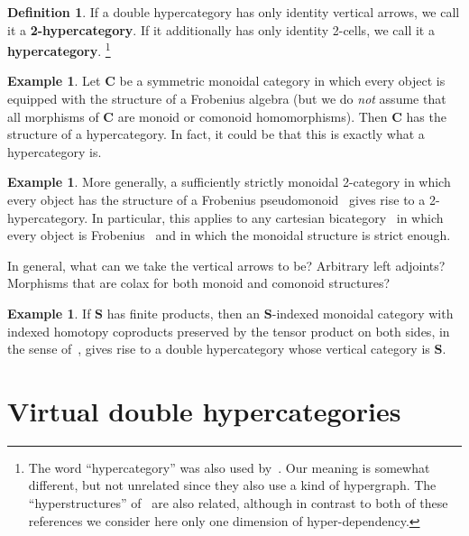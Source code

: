 \documentclass{article}
\theoremstyle{definition}
\newtheorem{defn}[thm]{Definition}
\newtheorem{eg}[thm]{Example}
\theoremstyle{remark}
\def\bC{\ensuremath{\mathbf{C}}\xspace}
\def\bS{\ensuremath{\mathbf{S}}\xspace}
\begin{document}
\begin{defn}
  If a double hypercategory has only identity vertical arrows, we call it a \textbf{2-hypercategory}.
  If it additionally has only identity 2-cells, we call it a \textbf{hypercategory}.%
  \footnote{The word ``hypercategory'' was also used by~\cite{hmt:strict-n-hypercats,mt:omega-hypergraphs}.
    Our meaning is somewhat different, but not unrelated since they also use a kind of hypergraph.
    The ``hyperstructures'' of~\cite{baas:higher-structures} are also related, although in contrast to both of these references we consider here only one dimension of hyper-dependency.}
\end{defn}

\begin{eg}
  Let \bC be a symmetric monoidal category in which every object is equipped with the structure of a Frobenius algebra (but we do \emph{not} assume that all morphisms of \bC are monoid or comonoid homomorphisms).
  Then \bC has the structure of a hypercategory.
  In fact, it could be that this is exactly what a hypercategory is.
\end{eg}

\begin{eg}
  More generally, a sufficiently strictly monoidal 2-category in which every object has the structure of a Frobenius pseudomonoid~\cite{street:frob-psmon} gives rise to a 2-hypercategory.
  In particular, this applies to any cartesian bicategory~\cite{ckww:cartbicats-ii} in which every object is Frobenius~\cite{ww:frob-cart} and in which the monoidal structure is strict enough.

  In general, what can we take the vertical arrows to be?
  Arbitrary left adjoints?
  Morphisms that are colax for both monoid and comonoid structures?
\end{eg}

\begin{eg}
  If \bS has finite products, then an \bS-indexed monoidal category with indexed homotopy coproducts preserved by the tensor product on both sides, in the sense of~\cite{ps:indexed}, gives rise to a double hypercategory whose vertical category is \bS.
\end{eg}




\section{Virtual double hypercategories}
\label{sec:vdhc}
\end{document}
